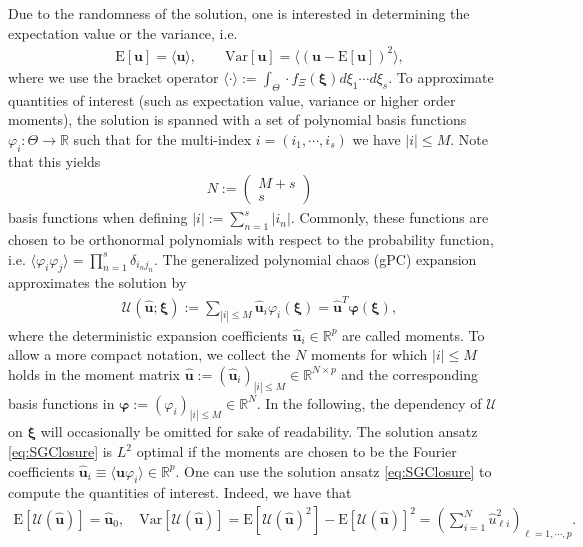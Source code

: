 Due to the randomness of the solution, one is interested in determining the expectation value or the variance, i.e.
\begin{align*}
\text{E}[\bm{u}] = \langle \bm{u} \rangle,\qquad \text{Var}[\bm{u}] = \langle \left( \bm{u}-\text{E}[\bm{u}]\right)^2\rangle,
\end{align*}
where we use the bracket operator $\langle \cdot \rangle := \int_{\Theta} \cdot f_{\Xi}(\bm\xi)d\xi_1 \cdots d\xi_s$. To approximate quantities of interest (such as expectation value, variance or higher order moments), the solution is spanned with a set of polynomial basis functions $\varphi_{i}:\Theta\to\mathbb{R}$ such that for the multi-index $i = (i_1,\cdots,i_s)$ we have $|i| \leq M$. Note that this yields
\begin{align}\label{eq:numberBasisFcts}
N:=\begin{pmatrix}
M+s \\ s
\end{pmatrix}
\end{align}
basis functions when defining $|i|:=\sum_{n = 1}^s |i_n|$. Commonly, these functions are chosen to be orthonormal polynomials \cite{wiener1938homogeneous} with respect to the probability function, i.e. $\langle \varphi_i \varphi_j \rangle =\prod_{n=1}^s\delta_{i_nj_n}$. The generalized polynomial chaos (gPC) expansion \cite{xiu2002wiener} approximates the solution by
\begin{align}\label{eq:SGClosure}
\mathcal{U}(\bm{\hat u};\bm\xi):= \sum_{|i|\leq M} \bm{\hat{u}}_i\varphi_i(\bm{\xi}) = \hat{\bm u}^T\bm{\varphi}(\bm\xi),
\end{align}
where the deterministic expansion coefficients $\bm{\hat{u}}_i\in\mathbb{R}^p$ are called moments. To allow a more compact notation, we collect the $N$ moments for which $\vert i \vert \leq M$ holds in the moment matrix $\hat{\bm u}:=(\bm{\hat{u}}_i)_{|i|\leq M}\in\mathbb{R}^{N\times p}$ and the corresponding basis functions in $\bm{\varphi}:=(\varphi_i)_{|i|\leq M}\in\mathbb{R}^{N}$. In the following, the dependency of $\mathcal{U}$ on $\bm \xi$ will occasionally be omitted for sake of readability. The solution ansatz \eqref{eq:SGClosure} is $L^2$ optimal if the moments are chosen to be the Fourier coefficients $\bm{\hat u}_i \equiv \langle \bm{u}\varphi_i \rangle\in\mathbb{R}^p$. One can use the solution ansatz \eqref{eq:SGClosure} to compute the quantities of interest. Indeed, we have that
\begin{align*}
\text{E}[\mathcal{U}(\bm{\hat u})] = \bm{\hat u}_0,\quad \text{Var}[\mathcal{U}(\bm{\hat u})] = \text{E}[\mathcal{U}(\bm{\hat u})^2] - \text{E}[\mathcal{U}(\bm{\hat u})]^2 = \left(\sum_{i = 1}^N \hat{u}_{\ell i}^2\right)_{\ell = 1,\cdots,p}.
\end{align*}

